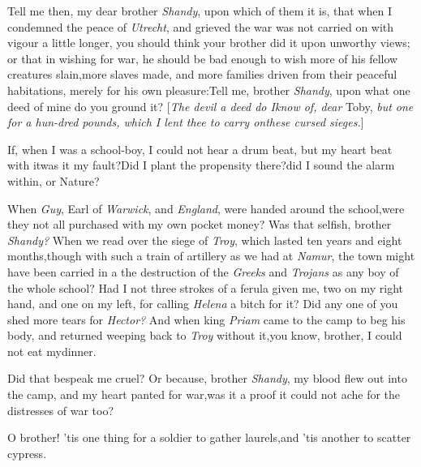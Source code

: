 \documentclass{article}
\begin{document}
Tell me then, my dear brother \textit{Shandy}, upon which of them
it is, that when I condemned the peace of \textit{Utrecht}, and
grieved the war was not carried on with vigour a little longer, you
should think your brother did it upon unworthy views; or that in
wishing for war, he should be bad enough to wish more of his
fellow creatures slain,\tsk more slaves made, and more families
driven from their peaceful habitations, merely for his own
pleasure:\tsh Tell me, brother \textit{Shandy}, upon what
one deed of mine do you ground it? [\textit{The devil a deed do I\break know
of, dear} Toby, \textit{but one for a hun-\break dred pounds, which I lent
thee to carry on\break these cursed sieges.}]

If, when I was a school-boy, I could not hear a drum beat, but
my heart beat with it\tsk was it my fault?\tsh Did I\break
plant the propensity there?\tsh did I sound the alarm
within, or Nature?

When \textit{Guy}, Earl of \textit{Warwick}, and 
 \textit{England}, were handed around the
school,\break\tsk were they not all purchased with my own pocket money?
Was that selfish, brother \textit{Shandy?} When we read over the
siege of \textit{Troy}, which lasted ten years and eight
months,\tsh though with such a train of artillery as we
had at \textit{Namur}, the town might have been carried in a
 the
destruction of the \textit{Greeks} and \textit{Trojans} as any boy of
the whole school? Had I not three strokes of a ferula given me, two
on my right hand, and one on my left, for calling \textit{Helena} a
bitch for it? Did any one of you shed more tears for \textit{Hector?}
And when king \textit{Priam} came to the camp to beg his body, and
returned weeping back to \textit{Troy} without it,\tsk you know,
brother, I could not eat my\break dinner.\tsh

\tsh Did that bespeak me cruel? Or because, brother
\textit{Shandy}, my blood flew out into the camp, and my heart panted
for war,\tsk was it a proof it could not ache for the distresses
of war too?

O brother! ’tis one thing for a soldier to gather
laurels,\tsk and ’tis another to scatter
cypress.
\end{document}
